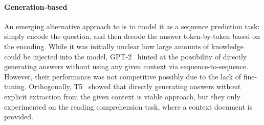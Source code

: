 

\paragraph{Generation-based \openqa}
An emerging alternative approach to \openqa is to model it as a sequence prediction task:
simply encode the question, and then decode the answer token-by-token based on the encoding.
While it was initially unclear how large amounts of knowledge could be injected into the model,
GPT-2~\cite{gpt2} hinted at the possibility of directly generating answers without using any given context via sequence-to-sequence. However, their performance was not competitive possibly due to the lack of fine-tuning. Orthogonally, T5~\cite{t5} showed that directly generating answers without explicit extraction from the given context is viable approach, but they only experimented on the reading comprehension task, where a context document is provided.

